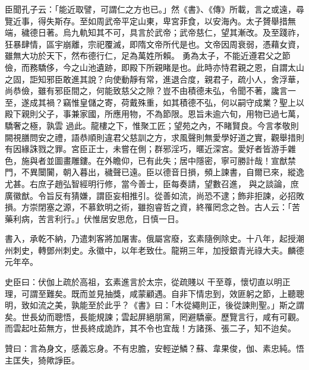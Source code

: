 \begin{pinyinscope}
 臣聞孔子云：「能近取譬，可謂仁之方也已。」然《書》、《傳》所載，言之或遠，尋覽近事，得失斯存。至如周武帝平定山東，卑宮菲食，以安海內。太子贇舉措無端，穢德日著。烏九軌知其不可，具言於武帝；武帝慈仁，望其漸改。及至踐祚，狂暴肆情，區宇崩離，宗祀覆滅，即隋文帝所代是也。文帝因周衰弱，憑藉女資，雖無大功於天下，然布德行仁，足為萬姓所賴。
 勇為太子，不能近遵君父之節儉，而務驕侈，今之山池遺跡，即殿下所親睹是也。此時亦恃君親之恩，自謂太山之固，詎知邪臣敢進其說？向使動靜有常，進退合度，親君子，疏小人，舍浮華，尚恭儉，雖有邪臣間之，何能致慈父之隙？豈不由積德未弘，令聞不著，讒言一至，遂成其禍？竊惟皇儲之寄，荷戴殊重，如其積德不弘，何以嗣守成業？聖上以殿下親則父子，事兼家國，所應用物，不為節限。恩旨未逾六旬，用物已過七萬，驕奢之極，孰雲
 過此。龍樓之下，惟聚工匠；望苑之內，不睹賢良。今言孝敬則闕視膳問安之禮，語恭順則違君父慈訓之方，求風聲則無愛學好道之實，觀舉措則有因緣誅戮之罪。宮臣正士，未嘗在側；群邪淫巧，暱近深宮。愛好者皆游手雜色，施與者並圖畫雕鏤。在外瞻仰，已有此失；居中隱密，寧可勝計哉！宣猷禁門，不異闤闠，朝入暮出，穢聲已遠。臣以德音日損，頻上諫書，自爾已來，縱逸尤甚。右庶子趙弘智經明行修，當今善士，臣每奏請，望數召進，
 與之談論，庶廣徽猷。令旨反有猜嫌，謂臣妄相推引。從善如流，尚恐不逮；飾非拒諫，必招敗損。方崇閉塞之源，不慕欽明之術，雖抱睿哲之資，終罹罔念之咎。古人云：「苦藥利病，苦言利行。」伏惟居安思危，日慎一日。



 書入，承乾不納，乃遣刺客將加屠害。俄屬宮廢，玄素隨例除史。十八年，起授潮州刺史，轉鄧州刺史。永徽中，以年老致仕。龍朔三年，加授銀青光祿大夫。麟德元年卒。



 史臣曰：伏伽上疏於高祖，玄素進言於太宗，從疏賤以
 干至尊，懷切直以明正理，可謂至難矣。既而並見抽獎，咸蒙顧遇。自非下情忠到，效匪躬之節，上聽聰明，致如流之美，孰能至於此乎？《書》曰：「木從繩則正，後從諫則聖。」斯之謂矣。世長幼而聰悟，長能規諫；雲起屏絕朋黨，罔避驕豪。歷覽言行，咸有可觀。而雲起吐茹無方，世長終成詭詐，其不令也宜哉！方諸孫、張二子，知不迨矣。



 贊曰：言為身文，感義忘身。不有忠膽，安輕逆鱗？蘇、韋果俊，伽、素忠純。悟主匡失，猗歟諍臣。



\end{pinyinscope}